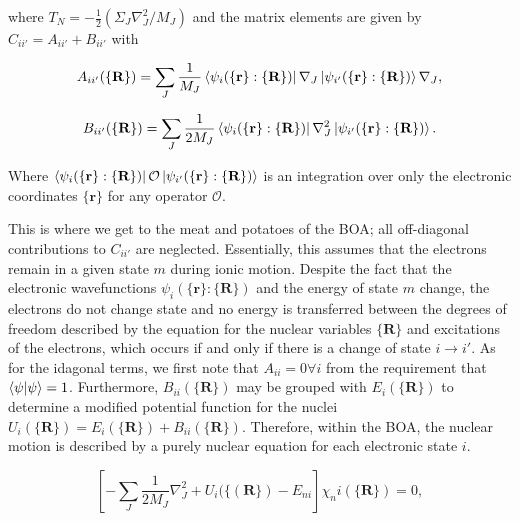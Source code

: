 where $T_{N} = - \frac{1}{2} \left( \Sigma_{J} \nabla_{J}^{2} / M_{J} \right)$ and the matrix elements are given by $C_{ii'}=A_{ii'} + B_{ii'}$ with

\begin{equation}
    A_{ii'}(\{ \textbf{R} \} ) = \sum_{J} \frac{1}{M_{J}} \bra{\psi_{i}(\{ \textbf{r} \} : \{ \textbf{R} \})} \nabla_{J} \ket{ \psi_{i'}(\{ \textbf{r} \} : \{ \textbf{R} \}) } \nabla_{J},
    \label{eqn:boa_A}
\end{equation}

\begin{equation}
    B_{ii'}(\{ \textbf{R} \} ) = \sum_{J} \frac{1}{2M_{J}} \bra{\psi_{i}(\{ \textbf{r} \} : \{ \textbf{R} \})} \nabla_{J}^{2} \ket{ \psi_{i'}(\{ \textbf{r} \} : \{ \textbf{R} \}) }.
    \label{eqn:boa_B}
\end{equation}

Where $ \bra{\psi_{i}(\{ \textbf{r} \} : \{ \textbf{R} \})} \mathcal{O} \ket{ \psi_{i'}(\{ \textbf{r} \} : \{ \textbf{R} \}) }$ is an integration over only the electronic coordinates $\{ \textbf{r} \}$ for any operator $\mathcal{O}$.

This is where we get to the meat and potatoes of the BOA; all off-diagonal contributions to $C_{ii'}$ are neglected. Essentially, this assumes that the electrons remain in a given state $m$ during ionic motion. Despite the fact that the electronic wavefunctions $\psi_{i}(\{ \textbf{r} \} : \{ \textbf{R} \} )$ and the energy of state $m$ change, the electrons do not change state and no energy is transferred between the degrees of freedom described by the equation for the nuclear variables $\{ \textbf{R} \}$ and excitations of the electrons, which occurs if and only if there is a change of state $ i \rightarrow i'$. As for the idagonal terms, we first note that $A_{ii} = 0 \forall i$ from the requirement that $\bra{\psi}\ket{\psi} = 1$. Furthermore, $B_{ii}(\{\textbf{R}\})$ may be grouped with $E_{i}(\{\textbf{R}\})$ to determine a modified potential function for the nuclei $U_{i}(\{ \textbf{R}\}) = E_{i}(\{ \textbf{R}\}) + B_{ii}(\{ \textbf{R}\})$. Therefore, within the BOA, the nuclear motion is described by a purely nuclear equation for each electronic state $i$.

\begin{equation}
    \left[ 
    -\sum_{J}\frac{1}{2M_{J}} \nabla_{J}^{2} + U_{i} ( \{ (\textbf{R} \}) -E_{ni}
    \right]\chi_ni( \{ \textbf{R}\} ) = 0,
    \label{eqn:boa_nuclear}
\end{equation}

